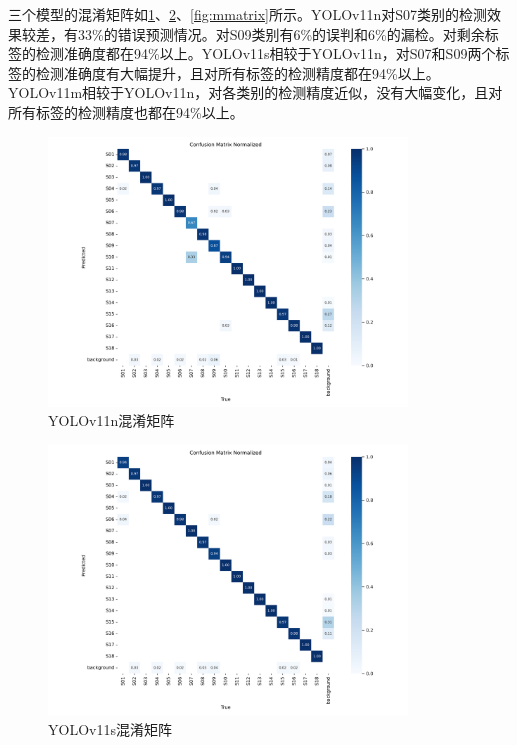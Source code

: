
三个模型的混淆矩阵如\ref{fig:nmatrix}、\ref{fig:smatrix}、\ref{fig:mmatrix}所示。YOLOv11n对S07类别的检测效果较差，有33\%的错误预测情况。对S09类别有6\%的误判和6\%的漏检。对剩余标签的检测准确度都在94\%以上。YOLOv11s相较于YOLOv11n，对S07和S09两个标签的检测准确度有大幅提升，且对所有标签的检测精度都在94\%以上。YOLOv11m相较于YOLOv11n，对各类别的检测精度近似，没有大幅变化，且对所有标签的检测精度也都在94\%以上。

\begin{figure}[H]
    \centering
    \includegraphics[width=0.85\textwidth]{figs/chap04/n_confusion_matrix_normalized.png}
    \caption{YOLOv11n混淆矩阵}
    \label{fig:nmatrix}
\end{figure}


\begin{figure}[H]
    \centering
    \includegraphics[width=0.85\textwidth]{figs/chap04/s_confusion_matrix_normalized.png}
    \caption{YOLOv11s混淆矩阵}
    \label{fig:smatrix}
\end{figure}



